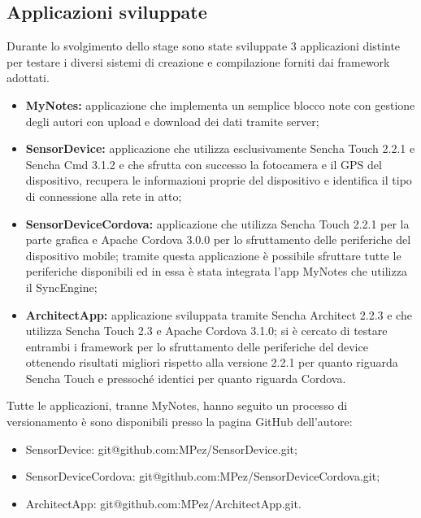 \subsection{Applicazioni sviluppate}
Durante lo svolgimento dello stage sono state sviluppate 3 applicazioni distinte per testare i diversi sistemi di creazione e compilazione forniti dai framework adottati.
\begin{itemize}
\item \textbf{MyNotes:} applicazione che implementa un semplice blocco note con gestione degli autori con upload e download dei dati tramite server;
\item \textbf{SensorDevice:} applicazione che utilizza esclusivamente Sencha Touch 2.2.1 e Sencha Cmd 3.1.2 e che sfrutta con successo la fotocamera e il GPS del dispositivo, recupera le informazioni proprie del dispositivo e identifica il tipo di connessione alla rete in atto;
\item \textbf{SensorDeviceCordova:} applicazione che utilizza Sencha Touch 2.2.1 per la parte grafica e Apache Cordova 3.0.0 per lo sfruttamento delle periferiche del dispositivo mobile; tramite questa applicazione è possibile sfruttare tutte le periferiche disponibili ed in essa è stata integrata l'app MyNotes che utilizza il SyncEngine;
\item \textbf{ArchitectApp:} applicazione sviluppata tramite Sencha Architect 2.2.3 e che utilizza Sencha Touch 2.3 e Apache Cordova 3.1.0; si è cercato di testare entrambi i framework per lo sfruttamento delle periferiche del device ottenendo risultati migliori rispetto alla versione 2.2.1 per quanto riguarda Sencha Touch e pressoché identici per quanto riguarda Cordova.
\end{itemize}

Tutte le applicazioni, tranne MyNotes, hanno seguito un processo di versionamento è sono disponibili presso la pagina GitHub dell'autore:
\begin{itemize}
\item SensorDevice: git@github.com:MPez/SensorDevice.git;
\item SensorDeviceCordova: git@github.com:MPez/SensorDeviceCordova.git;
\item ArchitectApp: git@github.com:MPez/ArchitectApp.git.
\end{itemize}

